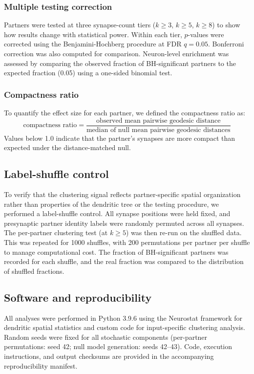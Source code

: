 \subsubsection{Multiple testing correction}

Partners were tested at three synapse-count tiers ($k \geq 3$, $k \geq 5$, $k \geq 8$) to show how results change with statistical power. Within each tier, $p$-values were corrected using the Benjamini-Hochberg procedure at FDR $q = 0.05$. Bonferroni correction was also computed for comparison. Neuron-level enrichment was assessed by comparing the observed fraction of BH-significant partners to the expected fraction (0.05) using a one-sided binomial test.

\subsubsection{Compactness ratio}

To quantify the effect size for each partner, we defined the compactness ratio as:
\begin{equation}
    \text{compactness ratio} = \frac{\text{observed mean pairwise geodesic distance}}{\text{median of null mean pairwise geodesic distances}}
\end{equation}
Values below 1.0 indicate that the partner's synapses are more compact than expected under the distance-matched null.

\subsection{Label-shuffle control}

To verify that the clustering signal reflects partner-specific spatial organization rather than properties of the dendritic tree or the testing procedure, we performed a label-shuffle control. All synapse positions were held fixed, and presynaptic partner identity labels were randomly permuted across all synapses. The per-partner clustering test (at $k \geq 5$) was then re-run on the shuffled data. This was repeated for 1000 shuffles, with 200 permutations per partner per shuffle to manage computational cost. The fraction of BH-significant partners was recorded for each shuffle, and the real fraction was compared to the distribution of shuffled fractions.

\subsection{Software and reproducibility}

All analyses were performed in Python 3.9.6 using the Neurostat framework for dendritic spatial statistics and custom code for input-specific clustering analysis. Random seeds were fixed for all stochastic components (per-partner permutations: seed 42; null model generation: seeds 42--43). Code, execution instructions, and output checksums are provided in the accompanying reproducibility manifest.
